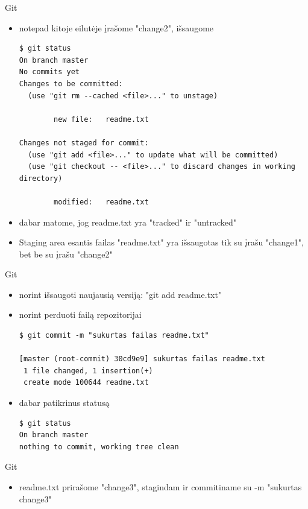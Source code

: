 \documentclass[11pt,xcolor=table]{beamer}
\begin{document}
\begin{frame}[fragile]{Git}
\begin{itemize}
\item notepad kitoje eilutėje įrašome "change2", išsaugome
\begin{lstlisting}
$ git status
On branch master
No commits yet
Changes to be committed:
  (use "git rm --cached <file>..." to unstage)

        new file:   readme.txt

Changes not staged for commit:
  (use "git add <file>..." to update what will be committed)
  (use "git checkout -- <file>..." to discard changes in working directory)

        modified:   readme.txt
\end{lstlisting}
\item dabar matome, jog readme.txt yra "tracked" ir "untracked"
\item Staging area esantis failas "readme.txt" yra išsaugotas tik su įrašu "change1", bet be su įrašu "change2"
\end{itemize}
\end{frame}

\begin{frame}[fragile]{Git}
\begin{itemize}
\item norint išsaugoti naujausią versiją: "git add readme.txt"
\item norint perduoti failą repozitorijai
\begin{lstlisting}
$ git commit -m "sukurtas failas readme.txt"

[master (root-commit) 30cd9e9] sukurtas failas readme.txt
 1 file changed, 1 insertion(+)
 create mode 100644 readme.txt
\end{lstlisting}
\item dabar patikrinus statusą
\begin{lstlisting}
$ git status
On branch master
nothing to commit, working tree clean
\end{lstlisting}
\end{itemize}
\end{frame}

\begin{frame}[fragile]{Git}
\begin{itemize}
\item readme.txt prirašome "change3", stagindam ir commitiname su -m "sukurtas change3"
\end{itemize}
\end{frame}
\end{document}
